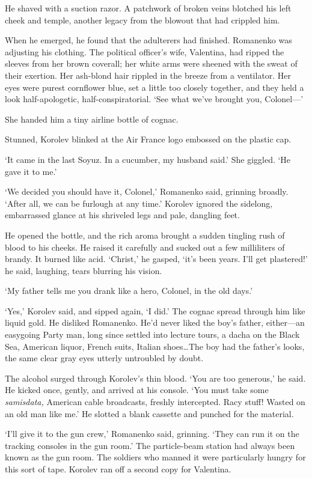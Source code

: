 He shaved with a suction razor. A patchwork of broken veins blotched his left cheek and temple, another legacy from the blowout that had crippled him.

When he emerged, he found that the adulterers had finished. Romanenko was adjusting his clothing. The political officer's wife, Valentina, had ripped the sleeves from her brown coverall; her white arms were sheened with the sweat of their exertion. Her ash-blond hair rippled in the breeze from a ventilator. Her eyes were purest cornflower blue, set a little too closely together, and they held a look half-apologetic, half-conspiratorial. `See what we've brought you, Colonel---'

She handed him a tiny airline bottle of cognac.

Stunned, Korolev blinked at the Air France logo embossed on the plastic cap.

`It came in the last Soyuz. In a cucumber, my husband said.' She giggled. `He gave it to me.'

`We decided you should have it, Colonel,' Romanenko said, grinning broadly. `After all, we can be furlough at any time.' Korolev ignored the sidelong, embarrassed glance at his shriveled legs and pale, dangling feet.

He opened the bottle, and the rich aroma brought a sudden tingling rush of blood to his cheeks. He raised it carefully and sucked out a few milliliters of brandy. It burned like acid. `Christ,' he gasped, `it's been years. I'll get plastered!' he said, laughing, tears blurring his vision.

`My father tells me you drank like a hero, Colonel, in the old days.'

`Yes,' Korolev said, and sipped again, `I did.' The cognac spread through him like liquid gold. He disliked Romanenko. He'd never liked the boy's father, either---an easygoing Party man, long since settled into lecture tours, a dacha on the Black Sea, American liquor, French suits, Italian shoes\ldots The boy had the father's looks, the same clear gray eyes utterly untroubled by doubt.

The alcohol surged through Korolev's thin blood. `You are too generous,' he said. He kicked once, gently, and arrived at his console. `You must take some \textit{samisdata,} American cable broadcasts, freshly intercepted. Racy stuff! Wasted on an old man like me.' He slotted a blank cassette and punched for the material.

`I'll give it to the gun crew,' Romanenko said, grinning. `They can run it on the tracking consoles in the gun room.' The particle-beam station had always been known as the gun room. The soldiers who manned it were particularly hungry for this sort of tape. Korolev ran off a second copy for Valentina.


